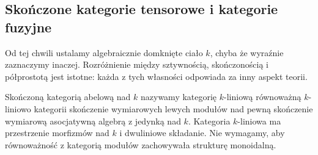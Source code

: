 \subsection{Skończone kategorie tensorowe i kategorie fuzyjne}

Od tej chwili ustalamy algebraicznie domknięte ciało $k$, chyba że wyraźnie zaznaczymy inaczej. Rozróżnienie między sztywnością, skończonością i półprostotą jest istotne: każda z tych własności odpowiada za inny aspekt teorii.

\begin{definicja}\label{cat:def:tf-finite-abelian}
Skończoną kategorią abelową nad $k$ nazywamy kategorię $k$-liniową równoważną $k$-liniowo kategorii skończenie wymiarowych lewych modułów nad pewną skończenie wymiarową asocjatywną algebrą z jedynką nad $k$. Kategoria $k$-liniowa ma przestrzenie morfizmów nad $k$ i dwuliniowe składanie. Nie wymagamy, aby równoważność z kategorią modułów zachowywała strukturę monoidalną.
\end{definicja}

